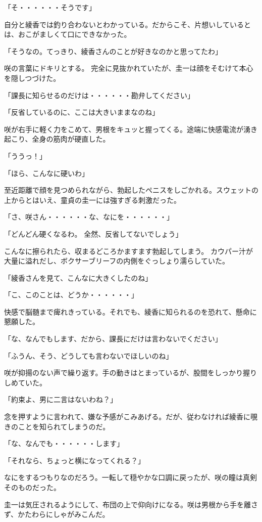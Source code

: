 ﻿\documentclass[book,tate]{jlreq}
\begin{document}
「そ・・・・・・そうです」

自分と綾香では釣り合わないとわかっている。だからこそ、片想いしているとは、おこがましくて口にできなかった。

「そうなの。てっきり、綾香さんのことが好きなのかと思ってたわ」

咲の言葉にドキリとする。 完全に見抜かれていたが、圭一は顔をそむけて本心を隠しつづけた。

「課長に知らせるのだけは・・・・・・勘弁してください」

「反省しているのに、ここは大きいままなのね」

咲が右手に軽く力をこめて、男根をキュッと握ってくる。途端に快感電流が湧き起こり、全身の筋肉が硬直した。

「ううっ！」

「ほら、こんなに硬いわ」

至近距離で顔を見つめられながら、勃起したペニスをしごかれる。スウェットの上からとはいえ、童貞の圭一には強すぎる刺激だった。

「さ、咲さん・・・・・・な、なにを・・・・・・」

「どんどん硬くなるわ。 全然、反省してないでしょう」

こんなに擦られたら、収まるどころかますます勃起してしまう。 カウパー汁が大量に溢れだし、ボクサーブリーフの内側をぐっしょり濡らしていた。

「綾香さんを見て、こんなに大きくしたのね」

「こ、このことは、どうか・・・・・・」

快感で脳髄まで痺れきっている。それでも、綾香に知られるのを恐れて、懸命に懇願した。

「な、なんでもします、だから、課長にだけは言わないでください」

「ふうん、そう、どうしても言わないでほしいのね」

咲が抑揚のない声で繰り返す。手の動きはとまっているが、股間をしっかり握りしめていた。

「約束よ、男に二言はないわね？」

念を押すように言われて、嫌な予感がこみあげる。だが、従わなければ綾香に覗きのことを知られてしまうのだ。

「な、なんでも・・・・・・します」

「それなら、ちょっと横になってくれる？」

なにをするつもりなのだろう。一転して穏やかな口調に戻ったが、咲の瞳は真剣そのものだった。

圭一は気圧されるようにして、布団の上で仰向けになる。咲は男根から手を離さず、かたわらにしゃがみこんだ。
\end{document}
